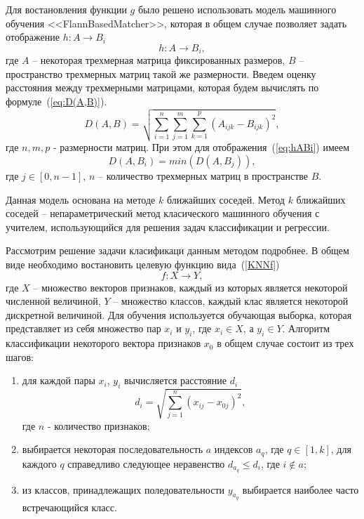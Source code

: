 \documentclass[14pt, a4paper]{extreport}
\begin{document}
	Для востановления функции $g$ было решено использовать модель машинного обучения <<FlannBasedMatcher>>, которая в общем случае позволяет задать отображение 
	$h: A \rightarrow B_i$ 
	\begin{equation}
		h: A \rightarrow B_i,
		\label{eq:hABi}
	\end{equation}
	где $A$ -- некоторая трехмерная матрица фиксированных размеров, $B$ -- пространство трехмерных матриц такой же размерности. Введем оценку расстояния между трехмерными матрицами, которая будем вычислять по формуле~(\ref{eq:D(A,B)}).
	\begin{equation}
		D(A, B) = \sqrt{\sum\limits_{i=1}^n \sum\limits_{j=1}^m \sum\limits_{k=1}^p (A_{ijk} - B_{ijk})^2},
		\label{eq:D(A,B)}
	\end{equation}
	где $n, m, p$ - размерности матриц. При этом для отображения~(\ref{eq:hABi}) имеем 
	\begin{equation*}
		D(A, B_i) = min(D(A, B_j)), 
		\label{eq:D(A,B_i)}
	\end{equation*}
	где $j \in [0, n-1]$, $n$ -- количество трехмерных матриц в пространстве $B$. 
	
	Данная модель основана на методе $k$ ближайших соседей. Метод $k$ ближайших соседей -- непараметрический метод класического машинного обучения с учителем, использующийся для решения задач классификации и регрессии. 
	
	Рассмотрим решение задачи класификаци данным методом подробнее. В общем виде необходимо востановить целевую функцию вида~(\ref{KNNf})
	\begin{equation}
		f: X \rightarrow Y, 
		\label{KNNf}
	\end{equation}
	где $X$ -- множество векторов признаков, каждый из которых является некоторой численной величиной, $Y$ -- множество классов, каждый клас является некоторой дискретной величиной. Для обучения используется обучающая выборка, которая представляет из себя множество пар $x_i$ и $y_i$, где $x_i \in X$, а $y_i \in Y$.
	Алгоритм классификации некоторого вектора признаков $x_0$ в общем случае состоит из трех шагов:
	\begin{enumerate}[label={\arabic*)}]
		\item для каждой пары $x_i$, $y_i$ вычисляется расстояние $d_i$
		\begin{equation}
			d_i = \sqrt{\sum\limits_{j=1}^n (x_{ij} - x_{0j})^2}, 
			\label{KNNf}
		\end{equation}
		где $n$ - количество признаков;
		\item выбирается некоторая последовательность $a$ индексов $a_q$, где $q \in [1, k]$, для каждого $q$ справедливо следующее неравенство $d_{a_q} \le d_{i}$, где $i \notin a$;
		\item из классов, принадлежащих поледовательности $y_{a_q}$ выбирается наиболее часто встречающийся класс.
	\end{enumerate}
\end{document}

